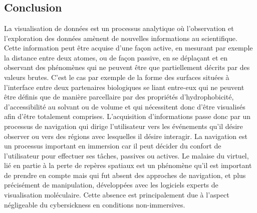 \\
\\
\\

\subsection{Conclusion}

La visualisation de données est un processus analytique où l'observation et l'exploration des données amènent de nouvelles informations au scientifique. Cette information peut être acquise d'une façon active, en mesurant par exemple la distance entre deux atomes, ou de façon passive, en se déplaçant et en observant des phénomènes qui ne peuvent être que partiellement décrits par des valeurs brutes. C'est le cas par exemple de la forme des surfaces situées à l'interface entre deux partenaires biologiques se liant entre-eux qui ne peuvent être définis que de manière parcellaire par des propriétés d'hydrophobicité, d'accessibilité au solvant ou de volume et qui nécessitent donc d'être visualisés afin d'être totalement comprises. L'acquisition d'informations passe donc par un processus de navigation qui dirige l'utilisateur vers les événements qu'il désire observer ou vers des régions avec lesquelles il désire interagir. La navigation est un processus important en immersion car il peut décider du confort de l'utilisateur pour effectuer ses tâches, passives ou actives. Le malaise du virtuel, lié en partie à la perte de repères spatiaux est un phénomène qu'il est important de prendre en compte mais qui fut absent des approches de navigation, et  plus précisément de manipulation, développées avec les logiciels experts de visualisation moléculaire. Cette absence est principalement due à l'aspect négligeable du cybersickness en conditions non-immersives.

